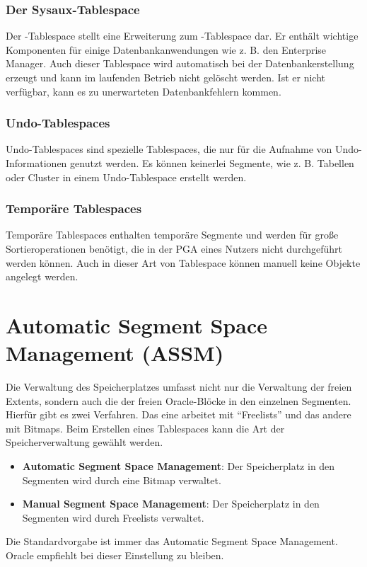           \subsubsection{Der Sysaux-Tablespace}
            Der -Tablespace stellt eine Erweiterung zum -Tablespace dar. Er enth\"alt wichtige Komponenten f\"ur einige Datenbankanwendungen wie z. B. den Enterprise Manager. Auch dieser Tablespace wird automatisch bei der Datenbankerstellung erzeugt und kann im laufenden Betrieb nicht gel\"oscht werden. Ist er nicht verf\"ugbar, kann es zu unerwarteten Datenbankfehlern kommen.
          \subsubsection{Undo-Tablespaces}
            Undo-Tablespaces sind spezielle Tablespaces, die nur f\"ur die Aufnahme von Undo-In\-for\-ma\-tionen genutzt werden. Es k\"onnen keinerlei Segmente, wie z. B. Tabellen oder Cluster in einem Undo-Tablespace erstellt werden.
          \subsubsection{Tempor\"are Tablespaces}
            Tempor\"are Tablespaces enthalten tempor\"are Segmente und werden f\"ur gro\ss{}e Sortieroperationen ben\"otigt, die in der PGA eines Nutzers nicht durchgef\"uhrt werden k\"onnen. Auch in dieser Art von Tablespace k\"onnen manuell keine Objekte angelegt werden.
    \section{Automatic Segment Space Management (ASSM)}
      Die Verwaltung des Speicherplatzes umfasst nicht nur die Verwaltung der freien Extents, sondern auch die der freien Oracle-Bl\"ocke in den einzelnen Segmenten. Hierf\"ur gibt es zwei Verfahren. Das eine arbeitet mit \enquote{Freelists} und das andere mit Bitmaps. Beim Erstellen eines Tablespaces kann die Art der Speicherverwaltung gew\"ahlt werden.

      \begin{itemize}
        \item \textbf{Automatic Segment Space Management}: Der Speicherplatz in den Segmenten wird durch eine Bitmap verwaltet.
        \item \textbf{Manual Segment Space Management}: Der Speicherplatz in den Segmenten wird durch Freelists verwaltet.
      \end{itemize}
      \begin{merke}
        Die Standardvorgabe ist immer das Automatic Segment Space Management. Oracle empfiehlt bei dieser Einstellung zu bleiben.
      \end{merke}
